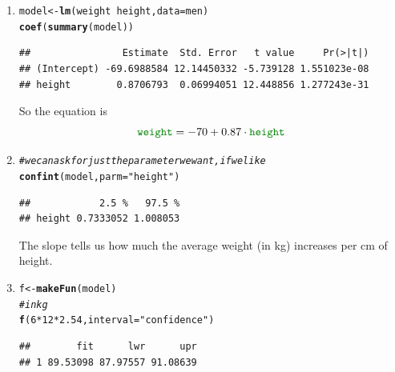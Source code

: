 \documentclass[twoside]{book}\usepackage[]{graphicx}\usepackage[]{xcolor}
\makeatletter
\newcommand{\hlnum}[1]{\textcolor[rgb]{0.686,0.059,0.569}{#1}}%
\newcommand{\hlstr}[1]{\textcolor[rgb]{0.192,0.494,0.8}{#1}}%
\newcommand{\hlcom}[1]{\textcolor[rgb]{0.678,0.584,0.686}{\textit{#1}}}%
\newcommand{\hlopt}[1]{\textcolor[rgb]{0,0,0}{#1}}%
\newcommand{\hlstd}[1]{\textcolor[rgb]{0.345,0.345,0.345}{#1}}%
\newcommand{\hlkwb}[1]{\textcolor[rgb]{0.69,0.353,0.396}{#1}}%
\newcommand{\hlkwc}[1]{\textcolor[rgb]{0.333,0.667,0.333}{#1}}%
\newcommand{\hlkwd}[1]{\textcolor[rgb]{0.737,0.353,0.396}{\textbf{#1}}}%
\newenvironment{kframe}{%
 \def\at@end@of@kframe{}%
 \ifinner\ifhmode%
  \def\at@end@of@kframe{\end{minipage}}%
  \begin{minipage}{\columnwidth}%
 \fi\fi%
 \def\FrameCommand##1{\hskip\@totalleftmargin \hskip-\fboxsep
 \colorbox{shadecolor}{##1}\hskip-\fboxsep
     \hskip-\linewidth \hskip-\@totalleftmargin \hskip\columnwidth}%
 \MakeFramed {\advance\hsize-\width
   \@totalleftmargin\z@ \linewidth\hsize
   \@setminipage}}%
 {\par\unskip\endMakeFramed%
 \at@end@of@kframe}
\newenvironment{knitrout}{}{} %
\newcommand{\variable}[1]{{\color{green!50!black}\texttt{#1}}}
\makeatother
\begin{document}
\begin{solution}
	\begin{enumerate}
		\item
\begin{knitrout}
\color{fgcolor}\begin{kframe}
\begin{alltt}
\hlstd{model} \hlkwb{<-} \hlkwd{lm}\hlstd{( weight} \hlopt{~} \hlstd{height,} \hlkwc{data}\hlstd{=men )}
\hlkwd{coef}\hlstd{(}\hlkwd{summary}\hlstd{(model))}
\end{alltt}
\begin{verbatim}
##                Estimate  Std. Error   t value     Pr(>|t|)
## (Intercept) -69.6988584 12.14450332 -5.739128 1.551023e-08
## height        0.8706793  0.06994051 12.448856 1.277243e-31
\end{verbatim}
\end{kframe}
\end{knitrout}
			So the equation is 
			\[
			\variable{weight} = 
			-70 + 
			0.87 \cdot \variable{height}
			\]
		\item
\begin{knitrout}
\color{fgcolor}\begin{kframe}
\begin{alltt}
\hlcom{# we can ask for just the parameter we want, if we like}
\hlkwd{confint}\hlstd{(model,} \hlkwc{parm}\hlstd{=}\hlstr{"height"}\hlstd{)}
\end{alltt}
\begin{verbatim}
##            2.5 %   97.5 %
## height 0.7333052 1.008053
\end{verbatim}
\end{kframe}
\end{knitrout}
The slope tells us how much the average weight (in kg) increases per 
cm of height.
		\item
\begin{knitrout}
\color{fgcolor}\begin{kframe}
\begin{alltt}
\hlstd{f} \hlkwb{<-} \hlkwd{makeFun}\hlstd{(model)}
\hlcom{# in kg}
\hlkwd{f}\hlstd{(} \hlnum{6} \hlopt{*} \hlnum{12} \hlopt{*} \hlnum{2.54}\hlstd{,} \hlkwc{interval}\hlstd{=}\hlstr{"confidence"} \hlstd{)}
\end{alltt}
\begin{verbatim}
##        fit      lwr      upr
## 1 89.53098 87.97557 91.08639

\end{verbatim}
\end{kframe}
\end{knitrout}
\end{enumerate}
\end{solution}
\end{document}
